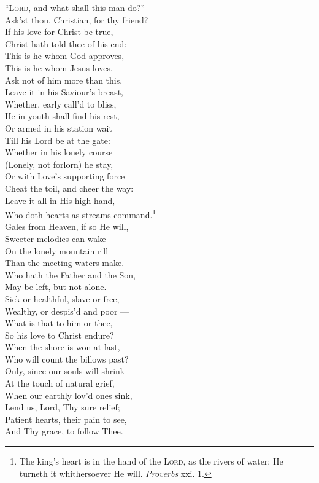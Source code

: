 “\textsc{Lord}, and what shall this man do?” \\
 Ask’st thou, Christian, for thy friend? \\
 If his love for Christ be true, \\
 Christ hath told thee of his end: \\
 This is he whom God approves, \\
 This is he whom Jesus loves. \\
  Ask not of him more than this, \\
 Leave it in his Saviour’s breast, \\
 Whether, early call’d to bliss, \\
 He in youth shall find his rest, \\
 Or armed in his station wait \\
 Till his Lord be at the gate: \\
  Whether in his lonely course \\
 (Lonely, not forlorn) he stay, \\
 Or with Love’s supporting force \\
 Cheat the toil, and cheer the way: \\
 Leave it all in His high hand, \\
 Who doth hearts as streams command.\footnote{The king’s heart is in the hand of the \textsc{Lord}, as the rivers of water: He turneth it whithersoever He will. \emph{Proverbs} xxi. 1.} \\
  Gales from Heaven, if so He will, \\
 Sweeter melodies can wake \\
 On the lonely mountain rill \\
 Than the meeting waters make. \\
 Who hath the Father and the Son, \\
 May be left, but not alone. \\
  Sick or healthful, slave or free, \\
 Wealthy, or despis’d and poor — \\
 What is that to him or thee, \\
 So his love to Christ endure? \\
 When the shore is won at last, \\
 Who will count the billows past? \\
  Only, since our souls will shrink \\
 At the touch of natural grief, \\
 When our earthly lov’d ones sink, \\
 Lend us, Lord, Thy sure relief; \\
 Patient hearts, their pain to see, \\
 And Thy grace, to follow Thee.\\

